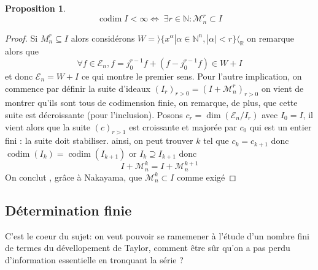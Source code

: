\documentclass[a4paper,12pt,oneside,titlepage]{article}
\theoremstyle{definition}
\newtheorem{proposition}[definition]{Proposition}
\theoremstyle{plain}
\begin{document}
\begin{proposition}
    \begin{equation*}
        \operatorname{codim} I<\infty \Leftrightarrow \; \exists r\in\mathbb{N}: \mathcal{M}_n^{r}\subset I
    \end{equation*}
\end{proposition}
\begin{proof}
    Si $M_n^r\subseteq I$ alors considérons $W=\rangle \{ x^\alpha | \alpha\in\mathbb{N}^n, |\alpha|<r \}\langle_{\mathbb{R}}$
    on remarque alors que
    \begin{equation*}
        \forall f\in\mathcal{E}_n, f=j_0^{r-1}f+(f-j_0^{r-1}f)\in W+ I
    \end{equation*}
    et donc $\mathcal{E}_n=W+I$ ce qui montre le premier sens.
    Pour l'autre implication, on commence par définir la suite d'ideaux $(I_r)_{r>0}=(I+\mathcal{M}_n^r)_{r>0}$ on vient de montrer qu'ils sont tous de codimension finie, on remarque, de plus, que cette suite est décroissante (pour l'inclusion). Posons $c_r=\dim(\mathcal{E}_n/I_r)$ avec $I_0=I$, il vient alors que la suite $(c)_{r>1}$ est croissante et majorée par $c_0$ qui est un entier fini : la suite doit stabiliser.
    ainsi, on peut trouver $k$ tel que $c_k=c_{k+1}$ donc $\operatorname{codim}(I_k)=\operatorname{codim}(I_{k+1})$ or $I_k\supseteq I_{k+1}$ donc
    \begin{equation*}
        I+\mathcal{M}_n^k=I+\mathcal{M}_n^{k+1}
    \end{equation*}
    On conclut , grâce à Nakayama, que $\mathcal{M}_n^k\subset I$ comme exigé
\end{proof}



\subsection{Détermination finie}
C'est le coeur du sujet: on veut 
pouvoir se ramemener à l'étude d'un nombre fini de termes du dévellopement de Taylor, comment être sûr qu'on a pas perdu d'information essentielle en tronquant la série ?
\end{document}
